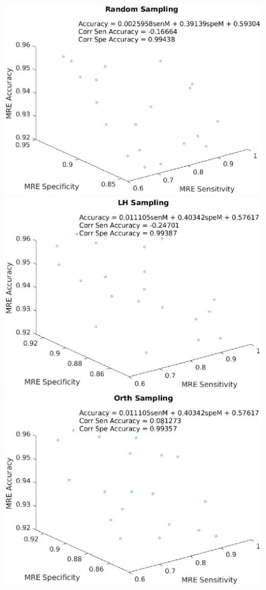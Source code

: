 \documentclass[aspectratio=1610]{beamer}
\begin{document}
\begin{frame}
\includegraphics[scale = .3]{mre4}
\includegraphics[scale = .3]{mre5}
\includegraphics[scale = .3]{mre6}
\end{frame}
\end{document}
